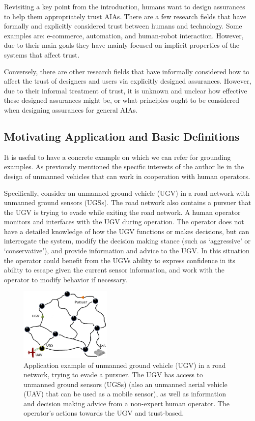     Revisiting a key point from the introduction, humans want to design assurances to help them appropriately trust AIAs. There are a few research fields that have formally and explicitly considered trust between humans and technology. Some examples are: e-commerce, automation, and human-robot interaction. However, due to their main goals they have mainly focused on implicit properties of the systems that affect trust.

    Conversely, there are other research fields that have informally considered how to affect the trust of designers and users via explicitly designed assurances. However, due to their informal treatment of trust, it is unknown and unclear how effective these designed assurances might be, or what principles ought to be considered when designing assurances for general AIAs.

\subsection{Motivating Application and Basic Definitions} \label{sec:mot_example}
    It is useful to have a concrete example on which we can refer for grounding examples. As previously mentioned the specific interests of the author lie in the design of unmanned vehicles that can work in cooperation with human operators.

    Specifically, consider an unmanned ground vehicle (UGV) in a road network with unmanned ground sensors (UGSs). The road network also contains a pursuer that the UGV is trying to evade while exiting the road network. A human operator monitors and interfaces with the UGV during operation. The operator does not have a detailed knowledge of how the UGV functions or makes decisions, but can interrogate the system, modify the decision making stance (such as `aggressive' or `conservative'), and provide information and advice to the UGV. In this situation the operator could benefit from the UGVs ability to express confidence in its ability to escape given the current sensor information, and work with the operator to modify behavior if necessary.

	\begin{figure}[htbp]
    	\centering
     	\includegraphics[width=0.4\textwidth]{Figures/RoadNet}
    	\caption{Application example of unmanned ground vehicle (UGV) in a road network, trying to evade a pursuer. The UGV has access to unmanned ground sensors (UGSs) (also an unmanned aerial vehicle (UAV) that can be used as a mobile sensor), as well as information and decision making advice from a non-expert human operator. The operator's actions towards the UGV and trust-based.}
        \label{fig:RoadNet}
    \end{figure}

